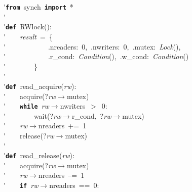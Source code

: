 \'\>\texttt{\textbf{from}}~synch~\texttt{\textbf{import}}~*\\

\'\>\\

\'\>\texttt{\textbf{def}}~RWlock():\\

\'\>~~~~\textit{result}~=~\{\\

\'\>~~~~~~~~~~~~.nreaders:~0,~.nwriters:~0,~.mutex:~\textit{Lock}(),\\

\'\>~~~~~~~~~~~~.r\_cond:~\textit{Condition}(),~.w\_cond:~\textit{Condition}()\\

\'\>~~~~~~~~\}\\

\'\>~~~~\\

\'\>\texttt{\textbf{def}}~read\_acquire(\textit{rw}):\\

\'\>~~~~acquire(?\textit{rw}$\rightarrow$mutex)\\

\'\>~~~~\texttt{\textbf{while}}~\textit{rw}$\rightarrow$nwriters~$>$~0:\\

\'\>~~~~~~~~wait(?\textit{rw}$\rightarrow$r\_cond,~?\textit{rw}$\rightarrow$mutex)\\

\'\>~~~~\textit{rw}$\rightarrow$nreaders~+=~1\\

\'\>~~~~release(?\textit{rw}$\rightarrow$mutex)\\

\'\>\\

\'\>\texttt{\textbf{def}}~read\_release(\textit{rw}):\\

\'\>~~~~acquire(?\textit{rw}$\rightarrow$mutex)\\

\'\>~~~~\textit{rw}$\rightarrow$nreaders~--=~1\\

\'\>~~~~\texttt{\textbf{if}}~\textit{rw}$\rightarrow$nreaders~==~0:\\

